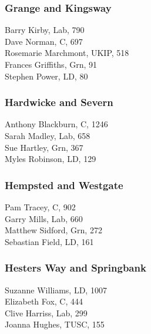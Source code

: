\documentclass[a4paper,openany,10pt]{book}
\begin{document}
\subsubsection*{Grange and Kingsway}



Barry Kirby, Lab, 790\\
Dave Norman, C, 697\\
Rosemarie Marchmont, UKIP, 518\\
Frances Griffiths, Grn, 91\\
Stephen Power, LD, 80\\


\subsubsection*{Hardwicke and Severn}



Anthony Blackburn, C, 1246\\
Sarah Madley, Lab, 658\\
Sue Hartley, Grn, 367\\
Myles Robinson, LD, 129\\


\subsubsection*{Hempsted and Westgate}



Pam Tracey, C, 902\\
Garry Mills, Lab, 660\\
Matthew Sidford, Grn, 272\\
Sebastian Field, LD, 161\\


\subsubsection*{Hesters Way and Springbank}



Suzanne Williams, LD, 1007\\
Elizabeth Fox, C, 444\\
Clive Harriss, Lab, 299\\
Joanna Hughes, TUSC, 155\\
\end{document}
